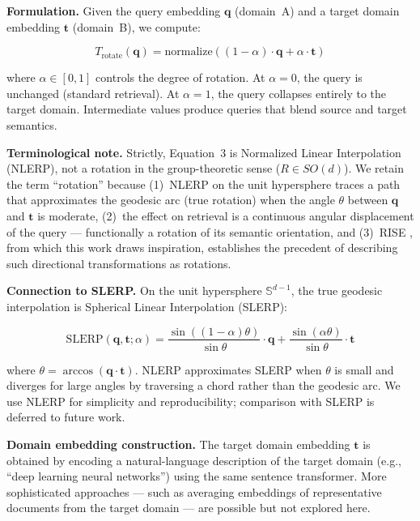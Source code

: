 \documentclass{article}
\begin{document}
\textbf{Formulation.} Given the query embedding $\mathbf{q}$ (domain~A) and a target domain embedding $\mathbf{t}$ (domain~B), we compute:

\begin{equation}
T_{\text{rotate}}(\mathbf{q}) = \text{normalize}\left((1 - \alpha) \cdot \mathbf{q} + \alpha \cdot \mathbf{t}\right)
\end{equation}

where $\alpha \in [0, 1]$ controls the degree of rotation. At $\alpha = 0$, the query is unchanged (standard retrieval). At $\alpha = 1$, the query collapses entirely to the target domain. Intermediate values produce queries that blend source and target semantics.

\textbf{Terminological note.} Strictly, Equation~3 is Normalized Linear Interpolation (NLERP), not a rotation in the group-theoretic sense ($R \in SO(d)$). We retain the term ``rotation'' because (1)~NLERP on the unit hypersphere traces a path that approximates the geodesic arc (true rotation) when the angle $\theta$ between $\mathbf{q}$ and $\mathbf{t}$ is moderate, (2)~the effect on retrieval is a continuous angular displacement of the query --- functionally a rotation of its semantic orientation, and (3)~RISE \cite{rise2025}, from which this work draws inspiration, establishes the precedent of describing such directional transformations as rotations.

\textbf{Connection to SLERP.} On the unit hypersphere $\mathbb{S}^{d-1}$, the true geodesic interpolation is Spherical Linear Interpolation (SLERP):

\begin{equation}
\text{SLERP}(\mathbf{q}, \mathbf{t}; \alpha) = \frac{\sin((1-\alpha)\theta)}{\sin\theta} \cdot \mathbf{q} + \frac{\sin(\alpha\theta)}{\sin\theta} \cdot \mathbf{t}
\end{equation}

where $\theta = \arccos(\mathbf{q} \cdot \mathbf{t})$. NLERP approximates SLERP when $\theta$ is small and diverges for large angles by traversing a chord rather than the geodesic arc. We use NLERP for simplicity and reproducibility; comparison with SLERP is deferred to future work.

\textbf{Domain embedding construction.} The target domain embedding $\mathbf{t}$ is obtained by encoding a natural-language description of the target domain (e.g., ``deep learning neural networks'') using the same sentence transformer. More sophisticated approaches --- such as averaging embeddings of representative documents from the target domain --- are possible but not explored here.
\end{document}
